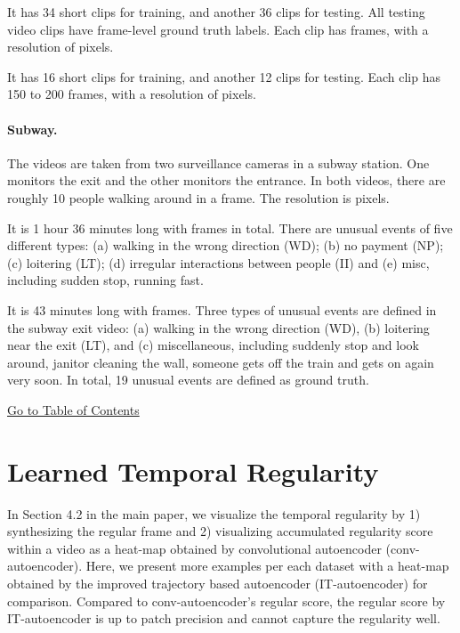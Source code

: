 \documentclass[10pt,twocolumn,letterpaper]{article}
\begin{document}
\vspace{1em}
 It has 34 short clips for training, and another 36 clips for testing. 
All testing video clips have frame-level ground truth labels. 
Each clip has  frames, with a resolution of  pixels.

\vspace{1em}
 It has 16 short clips for training, and another 12 clips for testing. 
Each clip has 150 to 200 frames, with a resolution of  pixels.


\paragraph{\bf Subway.}
The videos are taken from two surveillance cameras in a subway station. 
One monitors the exit and the other monitors the entrance. 
In both videos, there are roughly 10 people walking around in a frame. The resolution is  pixels.

\vspace{1em}
It is 1 hour 36 minutes long with  frames in total. 
There are  unusual events of five different types: (a) walking in the wrong direction (WD); (b) no payment (NP); (c) loitering (LT); (d) irregular interactions between people (II) and (e) misc, including sudden stop, running fast.

\vspace{1em}
It is 43 minutes long with  frames. Three types of unusual events are defined in the subway exit video: (a) walking in the wrong direction (WD), (b) loitering near the exit (LT), and (c) miscellaneous, including suddenly stop and look around, janitor cleaning the wall, someone gets off the train and gets on again very soon. 
In total, 19 unusual events are defined as ground truth.

\begin{center}
	\hyperlink{page.11}{Go to Table of Contents}
\end{center}
\clearpage
 

\section{Learned Temporal Regularity}
\label{sec:temp_regularity}

In Section 4.2 in the main paper, we visualize the temporal regularity by 1) synthesizing the regular frame and 2) visualizing accumulated regularity score within a video as a heat-map obtained by convolutional autoencoder (conv-autoencoder).
Here, we present more examples per each dataset with a heat-map obtained by the improved trajectory based autoencoder (IT-autoencoder) for comparison.
Compared to conv-autoencoder's regular score, the regular score by IT-autoencoder is up to patch precision and cannot capture the regularity well.
\end{document}
